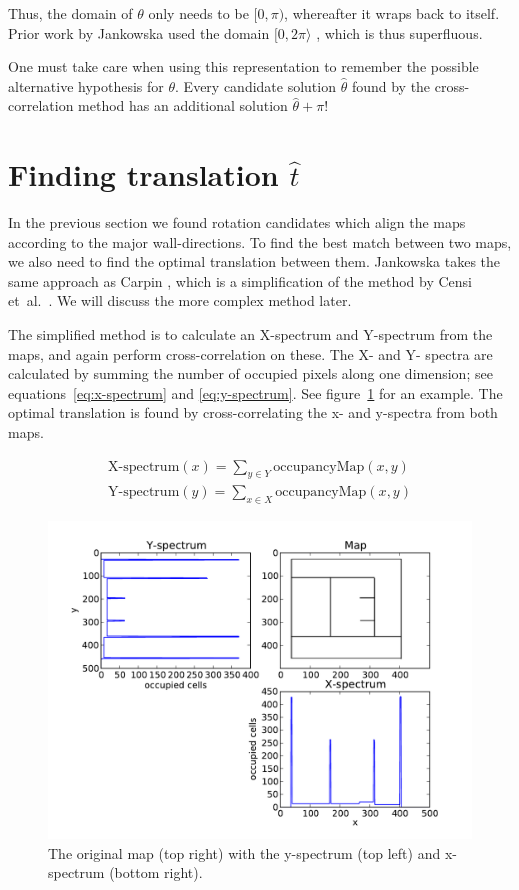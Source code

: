 Thus, the domain of $\theta$ only needs to be $[0, \pi)$, whereafter it wraps back to itself. Prior work by Jankowska used the domain $[0, 2\pi\rangle$ \cite{jankowska}, which is thus superfluous.

One must take care when using this representation to remember the possible alternative hypothesis for $\theta$. Every candidate solution $\hat\theta$ found by the cross-correlation method has an additional solution $\hat\theta + \pi$!

\section{Finding translation $\hat t$}
In the previous section we found rotation candidates which align the maps according to the major wall-directions. To find the best match between two maps, we also need to find the optimal translation between them. Jankowska \cite{jankowska2009hough} takes the same approach as Carpin \cite{carpin2008merging}, which is a simplification of the method by Censi et~al.\ \cite{sensi2005scan}. We will discuss the more complex method later. 

The simplified method is to calculate an X-spectrum and Y-spectrum from the maps, and again perform cross-correlation on these. The X- and Y- spectra are calculated by summing the number of occupied pixels along one dimension; see equations~\ref{eq:x-spectrum} and \ref{eq:y-spectrum}. See figure~\ref{fig:x-y-spectra} for an example. The optimal translation is found by cross-correlating the x- and y-spectra from both maps.

\begin{eqnarray}
\label{eq:x-spectrum}
\textrm{X-spectrum}(x) = \sum_{y \in Y} \textrm{occupancyMap}(x, y) \\
\label{eq:y-spectrum}
\textrm{Y-spectrum}(y) = \sum_{x \in X} \textrm{occupancyMap}(x, y) 
\end{eqnarray}

\begin{figure}[ht]
	\centering
	\includegraphics[width=\textwidth]{images/stitching/x_y_spectra.pdf}
	
	\caption{The original map (top right) with the y-spectrum (top left) and x-spectrum (bottom right).}
	\label{fig:x-y-spectra}
\end{figure}

